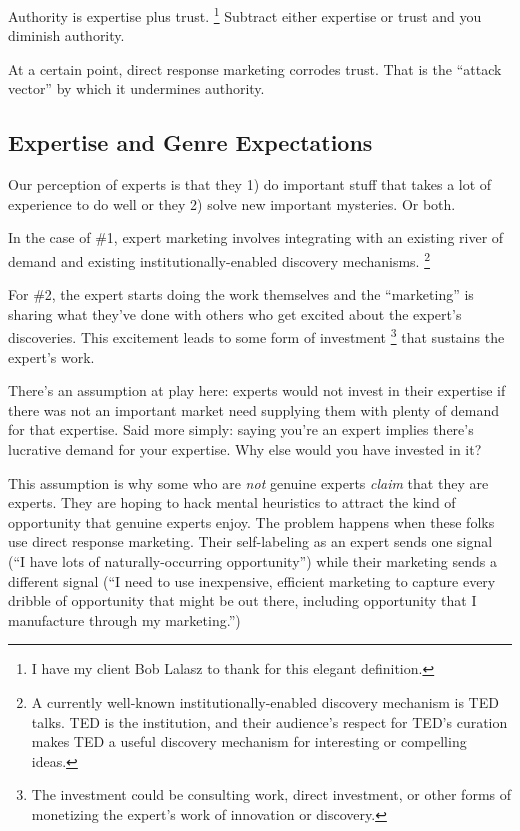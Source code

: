 \documentclass[13pt,]{tufte-handout}
\begin{document}
Authority is expertise plus trust. \footnote{I have my client Bob Lalasz
  to thank for this elegant definition.} Subtract either expertise or
trust and you diminish authority.

At a certain point, direct response marketing corrodes trust. That is
the ``attack vector'' by which it undermines authority.

\hypertarget{expertise-and-genre-expectations}{%
\subsection{Expertise and Genre
Expectations}\label{expertise-and-genre-expectations}}

Our perception of experts is that they 1) do important stuff that takes
a lot of experience to do well or they 2) solve new important mysteries.
Or both.

In the case of \#1, expert marketing involves integrating with an
existing river of demand and existing institutionally-enabled discovery
mechanisms. \footnote{A currently well-known institutionally-enabled
  discovery mechanism is TED talks. TED is the institution, and their
  audience's respect for TED's curation makes TED a useful discovery
  mechanism for interesting or compelling ideas.}

For \#2, the expert starts doing the work themselves and the
``marketing'' is sharing what they've done with others who get excited
about the expert's discoveries. This excitement leads to some form of
investment \footnote{The investment could be consulting work, direct
  investment, or other forms of monetizing the expert's work of
  innovation or discovery.} that sustains the expert's work.

There's an assumption at play here: experts would not invest in their
expertise if there was not an important market need supplying them with
plenty of demand for that expertise. Said more simply: saying you're an
expert implies there's lucrative demand for your expertise. Why else
would you have invested in it?

This assumption is why some who are \emph{not} genuine experts
\emph{claim} that they are experts. They are hoping to hack mental
heuristics to attract the kind of opportunity that genuine experts
enjoy. The problem happens when these folks use direct response
marketing. Their self-labeling as an expert sends one signal (``I have
lots of naturally-occurring opportunity'') while their marketing sends a
different signal (``I need to use inexpensive, efficient marketing to
capture every dribble of opportunity that might be out there, including
opportunity that I manufacture through my marketing.'')
\end{document}

